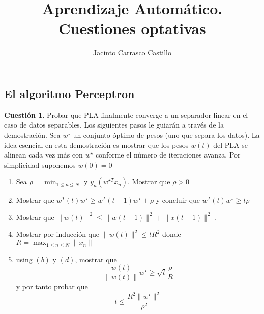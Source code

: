 \documentclass[11pt,leqno]{article}
\title{Aprendizaje Autom\'atico. Cuestiones optativas}
\author{Jacinto Carrasco Castillo}
\providecommand{\norm}[1]{\lVert#1\rVert}
\theoremstyle{definition}
\begin{document}
\maketitle

\newtheorem{cuestion}{Cuestión}
\newtheorem{solucion}{Solución}

\subsection{El algoritmo Perceptron}
\begin{cuestion}
Probar que PLA finalmente converge a un separador linear en el caso de datos
separables. Los siguientes pasos le guiarán a través de la demostración. Sea $w^\star$
un conjunto óptimo de pesos (uno que separa los datos). La idea esencial en esta
demostración es mostrar que los pesos $w(t)$ del PLA se alinean cada vez más con
$w^\star$ conforme el número de iteraciones avanza. Por simplicidad suponemos $w(0) = 0$

\begin{enumerate}[a]
\item Sea $\rho = \min_{1 \leq n \leq N}$ y $y_n (w^{\star T} x_n )$. Mostrar que $\rho > 0$
\item Mostrar que $w^T(t) w^\star \geq w^T(t-1)w^\star + \rho$ y concluir que $w^T(t) w^\star \geq t\rho$
\item Mostrar que $\norm{w(t)}^2 \leq \norm{w(t - 1)}^2 + \norm{x(t - 1)}^2$ .
\item Mostrar por inducción que  $\norm{w(t)}^2 \leq tR^2$ donde $R = \max_{1 \leq n \leq N} \norm{x_n}$
\item using $(b)$ y $(d)$, mostrar que
\[ \frac{w(t)}{\norm{w(t)}} w^\star \geq \sqrt{t} \frac{\rho}{R}\]
y por tanto probar que
\[ t \leq \frac{R^2 \norm{w^\star}^2}{\rho^2} \]
\end{enumerate}
\end{cuestion}
\end{document}
